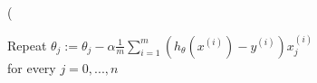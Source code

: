 \documentclass[]{article}
\title{}
\author{}
\begin{document}
\maketitle

\begin{abstract}

\end{abstract}

\section{}
\left( 

Repeat {
$\theta_{j}:=\theta_{j}-\alpha\frac{1}{m}\sum\limits_{i=1}^{m}(h_{\theta}(x^{(i)})-y^{(i)})x_{j}^{(i)}$\\
for every $j=0,...,n$
}
\end{document}
